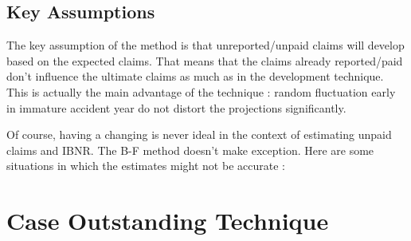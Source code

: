 \documentclass[11pt, english]{memoir}
\numberwithin{definition}{section}
\begin{document}
\section{Key Assumptions}
The key assumption of the method is that unreported/unpaid claims will develop based on the expected claims. That means that the claims already reported/paid don't influence the ultimate claims as much as in the development technique. This is actually the main advantage of the technique : random fluctuation early in immature accident year do not distort the projections significantly. 

Of course, having a changing is never ideal in the context of estimating unpaid claims and IBNR. The B-F method doesn't make exception. Here are some situations in which the estimates might not be accurate : 









\chapter{Case Outstanding Technique}
\end{document}
